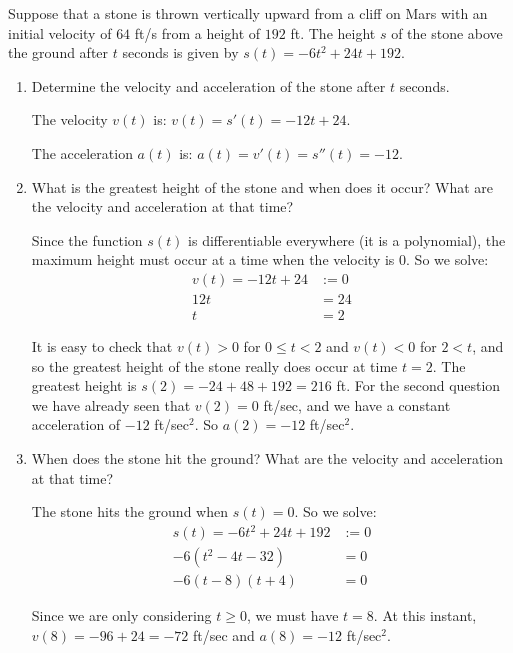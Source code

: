 \documentclass[nooutcomes,handout]{ximera}
\begin{document}
\begin{problem}
Suppose that a stone is thrown vertically upward from a cliff on Mars with an initial velocity of $64$ ft/s from a height of $192$ ft.  The height $s$ of the stone above the ground after $t$ seconds is given by $s(t) = -6t^2 + 24t + 192$.

	\begin{enumerate}
	
	\item  Determine the velocity and acceleration of the stone after $t$ seconds.
			\begin{freeResponse}
			The velocity $v(t)$ is:  $v(t) = s'(t) = -12t + 24$.
			
			The acceleration $a(t)$ is:  $a(t) = v'(t) = s''(t) = -12$.
			\end{freeResponse}
			
			
			
	\item  What is the greatest height of the stone and when does it occur?  What are the velocity and acceleration at that time?
			\begin{freeResponse}
			Since the function $s(t)$ is differentiable everywhere (it is a polynomial), the maximum height must occur at a time when the velocity is $0$.  So we solve:
			\begin{align*}
			v(t) = -12t+24 &:= 0 \\
			12t &= 24 \\
			t &= 2
			\end{align*}
			
			It is easy to check that $v(t) > 0$ for $0 \leq t < 2$ and $v(t) < 0$ for $2 < t$, and so the greatest height of the stone really does occur at time $t=2$.  The greatest height is $s(2) = -24 + 48 + 192 = 216$ ft.  For the second question we have already seen that $v(2) = 0$ ft/sec, and we have a constant acceleration of $-12$ ft/sec$^2$.  So $a(2) = -12$ ft/sec$^2$.
			\end{freeResponse}
			
			
			
	\item  When does the stone hit the ground?  What are the velocity and acceleration at that time?
			\begin{freeResponse}
			The stone hits the ground when $s(t) = 0$.  So we solve:
			\begin{align*}
			s(t) = -6t^2 + 24t + 192 &:= 0 \\
			-6(t^2 - 4t - 32) &= 0 \\
			-6(t-8)(t+4) &= 0 
			\end{align*}
			
			Since we are only considering $t \geq 0$, we must have $t=8$.  At this instant, $v(8) = -96 + 24 = -72$ ft/sec and $a(8) = -12$ ft/sec$^2$.  
			
			\end{freeResponse}
			
			
			
	\end{enumerate}
			
			
			
		
\end{problem}
\end{document}
